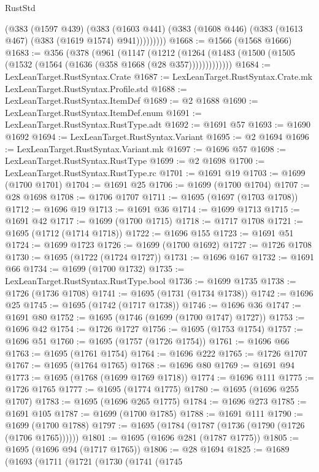 \begin{lexlean}{RustStd}
\begin{coremodule}
{\begin{coremodule}
{{{{{{{{{{{{{{{{            (@383
              (@1597 @439)
              (@383
                (@1603 @441)
                (@383 (@1608 @446) (@383 (@1613 @467) (@383 (@1619 @1574) @941)))))))))
@1668 := @1566 (@1568 @1666)
@1683 := @356
    (@378
      (@961
        (@1147
          (@1212 (@1264 (@1483 (@1500 (@1505 (@1532 (@1564 (@1636 (@358 @1668 (@28 @357)))))))))))))
@1684 := LexLeanTarget.RustSyntax.Crate
@1687 := LexLeanTarget.RustSyntax.Crate.mk LexLeanTarget.RustSyntax.Profile.std
@1688 := LexLeanTarget.RustSyntax.ItemDef
@1689 := @2 @1688
@1690 := LexLeanTarget.RustSyntax.ItemDef.enum
@1691 := LexLeanTarget.RustSyntax.RustType.adt
@1692 := @1691 @57
@1693 := @1690 @1692
@1694 := LexLeanTarget.RustSyntax.Variant
@1695 := @2 @1694
@1696 := LexLeanTarget.RustSyntax.Variant.mk
@1697 := @1696 @57
@1698 := LexLeanTarget.RustSyntax.RustType
@1699 := @2 @1698
@1700 := LexLeanTarget.RustSyntax.RustType.rc
@1701 := @1691 @19
@1703 := @1699 (@1700 @1701)
@1704 := @1691 @25
@1706 := @1699 (@1700 @1704)
@1707 := @28 @1698
@1708 := @1706 @1707
@1711 := @1695 (@1697 (@1703 @1708))
@1712 := @1696 @19
@1713 := @1691 @36
@1714 := @1699 @1713
@1715 := @1691 @42
@1717 := @1699 (@1700 @1715)
@1718 := @1717 @1708
@1721 := @1695 (@1712 (@1714 @1718))
@1722 := @1696 @155
@1723 := @1691 @51
@1724 := @1699 @1723
@1726 := @1699 (@1700 @1692)
@1727 := @1726 @1708
@1730 := @1695 (@1722 (@1724 @1727))
@1731 := @1696 @167
@1732 := @1691 @66
@1734 := @1699 (@1700 @1732)
@1735 := LexLeanTarget.RustSyntax.RustType.bool
@1736 := @1699 @1735
@1738 := @1726 (@1736 @1708)
@1741 := @1695 (@1731 (@1734 @1738))
@1742 := @1696 @25
@1745 := @1695 (@1742 (@1717 @1738))
@1746 := @1696 @36
@1747 := @1691 @80
@1752 := @1695 (@1746 (@1699 (@1700 @1747) @1727))
@1753 := @1696 @42
@1754 := @1726 @1727
@1756 := @1695 (@1753 @1754)
@1757 := @1696 @51
@1760 := @1695 (@1757 (@1726 @1754))
@1761 := @1696 @66
@1763 := @1695 (@1761 @1754)
@1764 := @1696 @222
@1765 := @1726 @1707
@1767 := @1695 (@1764 @1765)
@1768 := @1696 @80
@1769 := @1691 @94
@1773 := @1695 (@1768 (@1699 @1769 @1718))
@1774 := @1696 @111
@1775 := @1726 @1765
@1777 := @1695 (@1774 @1775)
@1780 := @1695 (@1696 @255 @1707)
@1783 := @1695 (@1696 @265 @1775)
@1784 := @1696 @273
@1785 := @1691 @105
@1787 := @1699 (@1700 @1785)
@1788 := @1691 @111
@1790 := @1699 (@1700 @1788)
@1797 := @1695 (@1784 (@1787 (@1736 (@1790 (@1726 (@1706 @1765))))))
@1801 := @1695 (@1696 @281 (@1787 @1775))
@1805 := @1695 (@1696 @94 (@1717 @1765))
@1806 := @28 @1694
@1825 := @1689
    (@1693
      (@1711
        (@1721
          (@1730
            (@1741
              (@1745
}}}}}}}}}}}}}}}}
\end{coremodule}}
\end{coremodule}
\end{lexlean}

